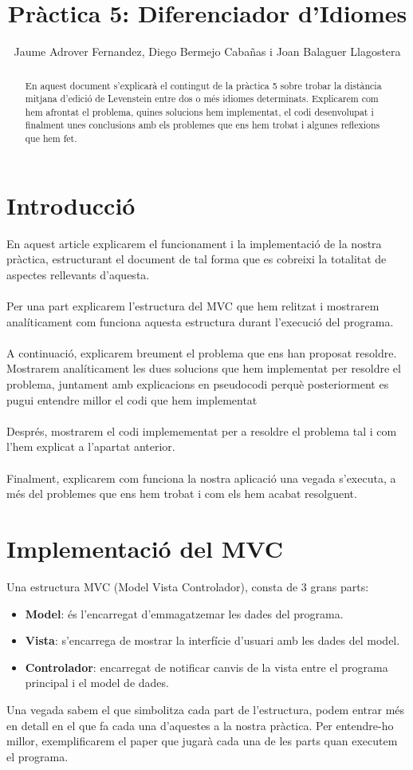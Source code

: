 \documentclass[conference]{IEEEtran}
\title{Pràctica 5: Diferenciador d'Idiomes}
\author{Jaume Adrover Fernandez, Diego Bermejo Cabañas i Joan Balaguer Llagostera}
\begin{document}
\maketitle

\begin{abstract}
    En aquest document s'explicarà el contingut de la pràctica 5 sobre trobar la distància mitjana d'edició de Levenstein entre dos o més idiomes determinats. Explicarem com hem afrontat el problema, quines solucions hem implementat,  el codi desenvolupat i finalment unes conclusions amb els problemes que ens hem trobat i algunes reflexions que hem fet.
\end{abstract}

\section{Introducció}
En aquest article explicarem el funcionament i la implementació de la nostra pràctica, estructurant el document de tal forma que es cobreixi la totalitat de aspectes rellevants d'aquesta.\\\\
Per una part explicarem l'estructura del MVC que hem relitzat i mostrarem analíticament com funciona aquesta estructura durant l'execució del programa.\\\\
A continuació, explicarem breument el problema que ens han proposat resoldre. Mostrarem analíticament les dues solucions que hem implementat per resoldre el problema, juntament amb explicacions en pseudocodi perquè posteriorment es pugui entendre millor el codi que hem implementat\\\\
Després, mostrarem el codi implemementat per a resoldre el problema tal i com l'hem explicat a l'apartat anterior.\\\\
Finalment, explicarem com funciona la nostra aplicació una vegada s'executa, a més del problemes que ens hem trobat i com els hem acabat resolguent.\\
\section{Implementació del MVC}
Una estructura MVC (Model Vista Controlador), consta de 3 grans parts:
\begin{itemize}
  \item \textbf{Model}: és l'encarregat d'emmagatzemar les dades del programa.\\
  \item \textbf{Vista}: s'encarrega de mostrar la interfície d'usuari amb les dades del model.\\
  \item \textbf{Controlador}: encarregat de notificar canvis de la vista entre el programa principal i el model de dades.\\
\end{itemize}
 Una vegada sabem el que simbolitza cada part de l'estructura, podem entrar més en detall en el que fa cada una d'aquestes a la nostra pràctica. Per entendre-ho millor, exemplificarem el paper que jugarà cada una de les parts quan executem el programa.
\end{document}
